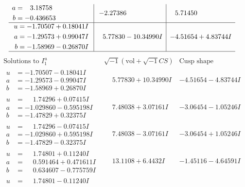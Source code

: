 \documentclass[1p]{elsarticle_modified}
\theoremstyle{definition}
\newcommand{\I}{\sqrt{-1}}
\begin{document}
$$\begin{array}{c|c|c}
\begin{aligned}
a &= \phantom{-}3.18758\phantom{ +0.000000I} \\
b &= -0.436653\phantom{ +0.000000I}\end{aligned}
 & -2.27386\phantom{ +0.000000I} & \phantom{-}5.71450\phantom{ +0.000000I} \\ \hline\begin{aligned}
u &= -1.70507 + 0.18041 I \\
a &= -1.29573 + 0.99047 I \\
b &= -1.58969 - 0.26870 I\end{aligned}
 & \phantom{-}5.77830 - 10.34990 I & -4.51654 + 4.83744 I\\
 \hline 
 \end{array}$$\newpage$$\begin{array}{c|c|c}  
\text{Solutions to }I^u_{1}& \I (\text{vol} + \sqrt{-1}CS) & \text{Cusp shape}\\
 \hline 
\begin{aligned}
u &= -1.70507 - 0.18041 I \\
a &= -1.29573 - 0.99047 I \\
b &= -1.58969 + 0.26870 I\end{aligned}
 & \phantom{-}5.77830 + 10.34990 I & -4.51654 - 4.83744 I \\ \hline\begin{aligned}
u &= \phantom{-}1.74296 + 0.07415 I \\
a &= -1.029860 - 0.595198 I \\
b &= -1.47829 + 0.32375 I\end{aligned}
 & \phantom{-}7.48038 + 3.07161 I & -3.06454 - 1.05246 I \\ \hline\begin{aligned}
u &= \phantom{-}1.74296 - 0.07415 I \\
a &= -1.029860 + 0.595198 I \\
b &= -1.47829 - 0.32375 I\end{aligned}
 & \phantom{-}7.48038 - 3.07161 I & -3.06454 + 1.05246 I \\ \hline\begin{aligned}
u &= \phantom{-}1.74801 + 0.11240 I \\
a &= \phantom{-}0.591464 + 0.471611 I \\
b &= \phantom{-}0.634607 - 0.775759 I\end{aligned}
 & \phantom{-}13.1108 + 6.4432 I & -1.45116 - 4.64591 I \\ \hline\begin{aligned}
u &= \phantom{-}1.74801 - 0.11240 I \\

\end{aligned}
\end{array}$$
\end{document}
